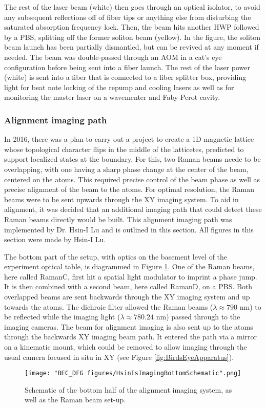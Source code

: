 The rest of the laser beam (white) then goes through an optical isolator, to avoid any subsequent reflections off of fiber tips or anything else from disturbing the saturated absorption frequency lock. Then, the beam hits another HWP followed by a PBS, splitting off the former soliton beam (yellow). In the figure, the soliton beam launch has been partially dismantled, but can be revived at any moment if needed. The beam was double-passed through an AOM in a cat's eye configuration before being sent into a fiber launch. The rest of the laser power (white) is sent into a fiber that is connected to  a fiber splitter box, providing light for beat note locking of the \Rb{} repump and cooling lasers as well as for monitoring the master laser on a wavementer and Faby-Perot cavity. 

\subsubsection{Alignment imaging path}
In 2016, there was a plan to carry out a project to create a 1D magnetic lattice whose topological character flips in the middle of the latticetes, predicted to support localized states at the boundary. For this, two Raman beams neede to be overlapping, with one having a sharp phase change at the center of the beam, centered on the atoms. This required precise control of the beam phase as well as precise alignment of the beam to the atoms. For optimal resolution, the Raman beams were to be sent upwards through the XY imaging system. To aid in alignment, it was decided that an additional imaging path that could detect these Raman beams directly would be built. This alignment imaging path was implemented by Dr. Hsin-I Lu and is outlined in this section. All figures in this section were made by Hsin-I Lu. 

The bottom part of the setup, with optics on the basement level of the experiment optical table, is diagrammed in Figure \ref{fig:HsinIsImagingBottomSchematic}. One of the Raman beams, here called RamanC, first hit a spatial light modulator to imprint a phase jump. It is then combined with a second beam, here called RamanD, on a PBS. Both overlapped beams are sent backwards through the XY imaging system and up towards the atoms. The dichroic filter allowed the Raman beams ($\lambda\approx790$ nm) to be reflected while the imaging light ($\lambda\approx780.24$ nm) passed through to the imaging cameras. The beam for alignment imaging is also sent up to the atoms through the backwards XY imaging beam path. It entered the path via a mirror on a kinematic mount, which could be removed to allow imaging through the usual camera focused in situ in XY (see Figure \ref{fig:BirdsEyeApparatus}). 
\begin{figure}
	\texttt{[image: "BEC\_DFG figures/HsinIsImagingBottomSchematic".png]}
\caption[Schematic of the bottom half of the alignment imaging system]{Schematic of the bottom half of the alignment imaging system, as well as the Raman beam set-up.}
\label{fig:HsinIsImagingBottomSchematic}
\end{figure}

